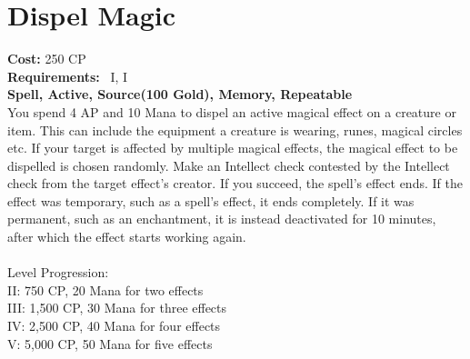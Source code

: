 \section{Dispel Magic}
\textbf{Cost:} 250 CP\\
\textbf{Requirements:}~ I, I\\
\textbf{Spell, Active, Source(100 Gold), Memory, Repeatable}\\
You spend 4 AP and 10 Mana to dispel an active magical effect on a creature or item.
This can include the equipment a creature is wearing, runes, magical circles etc.
If your target is affected by multiple magical effects, the magical effect to be dispelled is chosen randomly.
Make an Intellect check contested by the Intellect check from the target effect's creator.
If you succeed, the spell's effect ends.
If the effect was temporary, such as a spell's effect, it ends completely.
If it was permanent, such as an enchantment, it is instead deactivated for 10 minutes, after which the effect starts working again.\\
\\
Level Progression:\\
II: 750 CP, 20 Mana for two effects\\
III: 1,500 CP, 30 Mana for three effects\\
IV: 2,500 CP, 40 Mana for four effects\\
V: 5,000 CP, 50 Mana for five effects\\